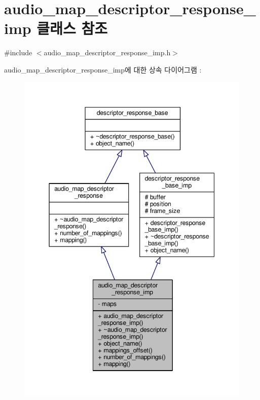 \hypertarget{classavdecc__lib_1_1audio__map__descriptor__response__imp}{}\section{audio\+\_\+map\+\_\+descriptor\+\_\+response\+\_\+imp 클래스 참조}
\label{classavdecc__lib_1_1audio__map__descriptor__response__imp}


{\ttfamily \#include $<$audio\+\_\+map\+\_\+descriptor\+\_\+response\+\_\+imp.\+h$>$}



audio\+\_\+map\+\_\+descriptor\+\_\+response\+\_\+imp에 대한 상속 다이어그램 \+: 
\nopagebreak
\begin{figure}[H]
\begin{center}
\leavevmode
\includegraphics[width=344pt]{classavdecc__lib_1_1audio__map__descriptor__response__imp__inherit__graph}
\end{center}
\end{figure}



